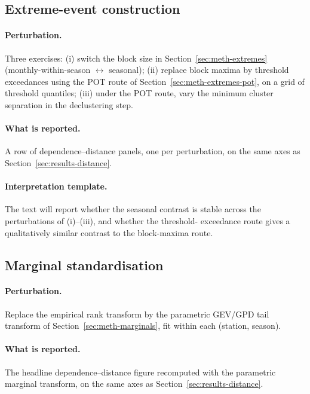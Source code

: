 \subsection{Extreme-event construction}\label{sec:rob-extremes}

\paragraph{Perturbation.}
Three exercises:
(i) switch the block size in
Section~\ref{sec:meth-extremes} (monthly-within-season
\(\leftrightarrow\) seasonal);
(ii) replace block maxima by threshold exceedances using the POT
route of Section~\ref{sec:meth-extremes-pot}, on a grid of threshold
quantiles;
(iii) under the POT route, vary the minimum cluster separation in
the declustering step.

\paragraph{What is reported.}
A row of dependence--distance panels, one per perturbation, on the
same axes as Section~\ref{sec:results-distance}.

\paragraph{Interpretation template.}
The text will report whether the seasonal contrast is stable
across the perturbations of (i)--(iii), and whether the threshold-
exceedance route gives a qualitatively similar contrast to the
block-maxima route.

\subsection{Marginal standardisation}\label{sec:rob-marginals}

\paragraph{Perturbation.}
Replace the empirical rank transform by the parametric
GEV/GPD tail transform of Section~\ref{sec:meth-marginals}, fit
within each (station, season).

\paragraph{What is reported.}
The headline dependence--distance figure recomputed with the
parametric marginal transform, on the same axes as
Section~\ref{sec:results-distance}.

